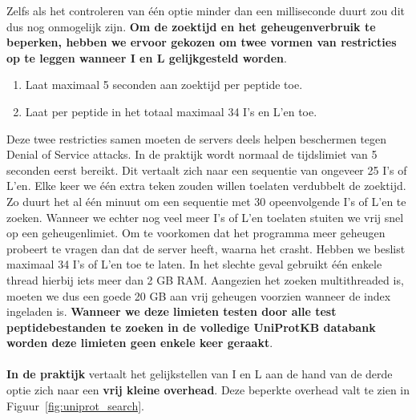 Zelfs als het controleren van één optie minder dan een milliseconde duurt zou dit dus nog onmogelijk zijn.
\textbf{Om de zoektijd en het geheugenverbruik te beperken, hebben we ervoor gekozen om twee vormen van restricties op te leggen wanneer I en L gelijkgesteld worden}.
\begin{enumerate}
    \item Laat maximaal 5 seconden aan zoektijd per peptide toe.
    \item Laat per peptide in het totaal maximaal 34 I's en L'en toe.
\end{enumerate}
Deze twee restricties samen moeten de servers deels helpen beschermen tegen Denial of Service attacks.
In de praktijk wordt normaal de tijdslimiet van 5 seconden eerst bereikt.
Dit vertaalt zich naar een sequentie van ongeveer 25 I's of L'en.
Elke keer we één extra teken zouden willen toelaten verdubbelt de zoektijd.
Zo duurt het al één minuut om een sequentie met 30 opeenvolgende I's of L'en te zoeken.
Wanneer we echter nog veel meer I's of L'en toelaten stuiten we vrij snel op een geheugenlimiet.
Om te voorkomen dat het programma meer geheugen probeert te vragen dan dat de server heeft, waarna het crasht.
Hebben we beslist maximaal 34 I's of L'en toe te laten.
In het slechte geval gebruikt één enkele thread hierbij iets meer dan 2 GB RAM\@.
Aangezien het zoeken multithreaded is, moeten we dus een goede 20 GB aan vrij geheugen voorzien wanneer de index ingeladen is.
\textbf{Wanneer we deze limieten testen door alle test peptidebestanden te zoeken in de volledige UniProtKB databank worden deze limieten geen enkele keer geraakt}.
\\ \\
\textbf{In de praktijk} vertaalt het gelijkstellen van I en L aan de hand van de derde optie zich naar een \textbf{vrij kleine overhead}.
Deze beperkte overhead valt te zien in Figuur~\ref{fig:uniprot_search}.

